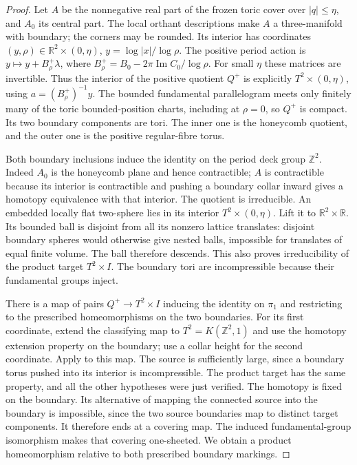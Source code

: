 \begin{proof}
Let $A$ be the nonnegative real part of the frozen toric
cover over $|q|\leq\eta$, and $A_0$ its central part.
The local orthant descriptions make $A$ a three-manifold
with boundary; the corners may be rounded.  Its interior
has coordinates $(y,\rho)\in\mathbb R^2\times(0,\eta)$,
$y=\log|x|/\log\rho$.  The positive period action is
$y\mapsto y+B_\rho^+\lambda$, where
$B_\rho^+=B_0-2\pi\operatorname{Im}C_0/\log\rho$.
For small $\eta$ these matrices are invertible.  Thus the
interior of the positive quotient $Q^+$ is explicitly
$T^2\times(0,\eta)$, using $a=(B_\rho^+)^{-1}y$.
The bounded fundamental parallelogram meets only finitely
many of the toric bounded-position charts, including at
$\rho=0$, so $Q^+$ is compact.  Its two boundary components
are tori.  The inner one is the honeycomb quotient, and
the outer one is the positive regular-fibre torus.

Both boundary inclusions induce the identity on the period
deck group $\mathbb Z^2$.  Indeed $A_0$ is the honeycomb
plane and hence contractible; $A$ is contractible because
its interior is contractible and pushing a boundary collar
inward gives a homotopy equivalence with that interior.
The quotient is irreducible.  An embedded locally flat
two-sphere lies in its interior $T^2\times(0,\eta)$.
Lift it to $\mathbb R^2\times\mathbb R$.  Its bounded
ball is disjoint from all its nonzero lattice translates:
disjoint boundary spheres would otherwise give nested
balls, impossible for translates of equal finite volume.
The ball therefore descends.  This also proves
irreducibility of the product target $T^2\times I$.
The boundary tori are incompressible because their
fundamental groups inject.

There is a map of pairs $Q^+\to T^2\times I$ inducing
the identity on $\pi_1$ and restricting to the prescribed
homeomorphisms on the two boundaries.  For its first
coordinate, extend the classifying map to $T^2=K(\mathbb
Z^2,1)$ and use the homotopy extension property on the
boundary; use a collar height for the second coordinate.
Apply \cite[Theorem 6.1, p.~77]{mapsWaldhausen68} to this
map.  The source is sufficiently large, since a boundary
torus pushed into its interior is incompressible.  The
product target has the same property, and all the other
hypotheses were just verified.  The homotopy is fixed on
the boundary.  Its alternative of mapping the connected
source into the boundary is impossible, since the two
source boundaries map to distinct target components.
It therefore ends at a covering map.  The induced
fundamental-group isomorphism makes that covering
one-sheeted.  We obtain a product homeomorphism relative
to both prescribed boundary markings.


\end{proof}
